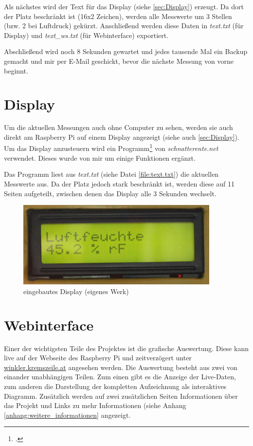 Als nächstes wird der Text für das Display (siehe \ref{sec:Display}) erzeugt. Da dort der Platz beschränkt ist (16x2 Zeichen), werden alle Messwerte um 3 Stellen (bzw. 2 bei Luftdruck) gekürzt. Anschließend werden diese Daten in \emph{text.txt} (für Display) und \emph{text\_ws.txt} (für Webinterface) exportiert.


Abschließend wird noch 8 Sekunden gewartet und jedes tausende Mal ein Backup gemacht und mir per E-Mail geschickt, bevor die nächste Messung von vorne beginnt.

\section{Display}
\label{sec:Software/Display}
Um die aktuellen Messungen auch ohne Computer zu sehen, werden sie auch direkt am Raspberry Pi auf einem Display angezeigt (siehe auch \ref{sec:Display}). Um das Display anzusteuern wird ein Programm\footcite{schnatterente_code} von \emph{schnatterente.net} verwendet. Dieses wurde von mir um einige Funktionen ergänzt. 

Das Programm liest aus \emph{text.txt} (siehe Datei \ref{file:text.txt}) die aktuellen Messwerte aus. Da der Platz jedoch stark beschränkt ist, werden diese auf 11 Seiten aufgeteilt, zwischen denen das Display alle 3 Sekunden wechselt.
\begin{figure}[h]
  \centering
     \includegraphics[width=0.9\textwidth]{figures/display.jpg}
  \caption{eingebautes Display (eigenes Werk)}
  \label{fig:display_alt}
\end{figure}

\section{Webinterface}
\label{sec:Webinterface}

Einer der wichtigsten Teile des Projektes ist die grafische Auswertung. Diese kann live auf der Webseite des Raspberry Pi und zeitverzögert unter \href{http://winkler.kremszeile.at}{winkler.kremszeile.at} angesehen werden. Die Auswertung besteht aus zwei von einander unabhängigen Teilen. Zum einen gibt es die Anzeige der Live-Daten, zum anderen die Darstellung der kompletten Aufzeichnung als interaktives Diagramm. Zusätzlich werden auf zwei zusätzlichen Seiten Informationen über das Projekt und Links zu mehr Informationen (siehe Anhang \ref{anhang:weitere_informationen} angezeigt.


